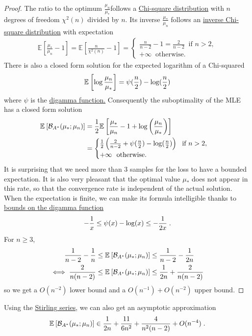 \documentclass{article}
\newcommand*{\expect}[2][]{\ensuremath{\mathbb{E}_{#1} \left[ #2 \right] }} %
\newcommand{\logpart}{A}
\newcommand{\bregmanconj}{\cB_{\logpart^*}}
\begin{document}
	\begin{proof}
	The ratio to the optimum  $\frac{\mu_n}{\mu_*}$follows a \href{https://en.wikipedia.org/wiki/Chi-square_distribution}{Chi-square distribution} with $n$ degrees of freedom $\chi^2(n)$ divided by $n$. Its inverse $\frac{\mu_*}{ \mu_n} $ follows an \href{https://en.wikipedia.org/wiki/Inverse-chi-squared_distribution}{inverse Chi-square distribution} with expectation 
	\begin{align}
		\expect{\frac{\mu_*}{ \mu_n}  - 1} 
		= \expect{\frac{n}{\chi^2(n)} - 1} =
		\begin{cases}
			\frac{n}{n-2} -1 = \frac{2}{n-2} \ \text{ if } n>2, \\
			+\infty \  \text{ otherwise. }
		\end{cases}
	\end{align}
	There is also a closed form solution for the expected logarithm of a Chi-squared\citep{pav2015moments}
	\begin{align}
		\expect{\log \frac{\mu_n}{\mu_*}} = \psi(\half[n]) - \log(\half[n])
	\end{align}
	where $\psi$ is the \href{https://en.wikipedia.org/wiki/Digamma_function}{digamma function.}
	Consequently the suboptimality of the MLE has a closed form solution
	\begin{align}
	\expect{\bregmanconj( \mu_*; \mu_n) }
	&= \half \expect{\frac{\mu_*}{ \mu_n} - 1 + \log \left(\frac{\mu_n}{\mu_*} \right) } \\
	& =
	\begin{cases}
		\half \left ( \frac{2}{n-2} +\psi(\half[n]) - \log(\half[n]) \right )  \ \text{ if } n>2, \\
			+\infty \  \text{ otherwise. }
	\end{cases}
	\end{align}
	It is surprising that we need more than $3$ samples for the loss to have a bounded expectation. 
	It is also very pleasant that the optimal value $\mu_*$ does not appear in this rate, so that the convergence rate is independent of the actual solution.
	When the expectation is finite, we can make its formula intelligible thanks to \href{https://en.wikipedia.org/wiki/Digamma_function#Inequalities}{bounds on the digamma function}
	\begin{align}
		-\frac{1}{x} \leq \psi(x) - \log(x) \leq -\frac{1}{2x}	\; .
	\end{align}
	  For $n\geq 3$,
	\begin{align}
		\inv{n-2} - \inv{n}
		&\leq \expect{\bregmanconj( \mu_*; \mu_n) }
		\leq \inv{n-2} - \inv{2 n} \\
		\iff
			\frac{2}{n(n-2)}
			&\leq \expect{\bregmanconj( \mu_*; \mu_n) }
			\leq \inv{2n} +\frac{2}{n(n-2)}
	\end{align}
	so we get a $O(n^{-2})$ lower bound and a $O(n^{-1}) + O(n^{-2})$ upper bound.
	\end{proof}
	Using the \href{https://en.wikipedia.org/wiki/Digamma_function#Recurrence_formula_and_characterization}{Stirling series}, we can also get an asymptotic approximation
	\begin{align}
		\expect{\bregmanconj( \mu_*; \mu_n) }
		\in \inv{2n} + \frac{11}{6 n^2} + \frac{4}{n^2(n-2)} + O(n^{-4}) \; .
	\end{align}
	
\end{document}
